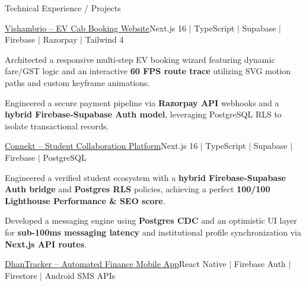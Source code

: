 \documentclass{resume}
\begin{document}
\vspace{-2mm}

\begin{rSection}{Technical Experience / Projects} \itemsep -4pt

\vspace{-1.5mm}

\begin{rSubsection}{\href{https://vishambrio.com}{Vishambrio -- EV Cab Booking Website}}{\footnotesize Next.js 16 $|$ TypeScript $|$ Supabase $|$ Firebase $|$ Razorpay $|$ Tailwind 4}{}{}\vspace{-4pt} 

\item Architected a responsive multi-step EV booking wizard featuring dynamic fare/GST logic and an interactive \textbf{60 FPS route trace} utilizing SVG motion paths and custom keyframe animations.

\item Engineered a secure payment pipeline via \textbf{Razorpay API} webhooks and a \textbf{hybrid Firebase-Supabase Auth model}, leveraging PostgreSQL RLS to isolate transactional records.

\end{rSubsection}



\begin{rSubsection}{\href{https://connekt-phi.vercel.app/}{Connekt -- Student Collaboration Platform}}{\footnotesize Next.js 16 $|$ TypeScript $|$ Supabase $|$ Firebase $|$ PostgreSQL}{}{}\vspace{-4pt} 

\item Engineered a verified student ecosystem with a \textbf{hybrid Firebase-Supabase Auth bridge} and \textbf{Postgres RLS} policies, achieving a perfect \textbf{100/100 Lighthouse Performance \& SEO score}.

\item Developed a messaging engine using \textbf{Postgres CDC} and an optimistic UI layer for \textbf{sub-100ms messaging latency} and institutional profile synchronization via \textbf{Next.js API routes}.

\end{rSubsection}



\begin{rSubsection}{\href{https://github.com/suryaansh132004/finance-tracker-app}{DhanTracker -- Automated Finance Mobile App}}{\footnotesize React Native $|$ Firebase Auth $|$ Firestore $|$ Android SMS APIs}{}{}\vspace{-4pt} 


\end{rSubsection}
\end{rSection}
\end{document}
